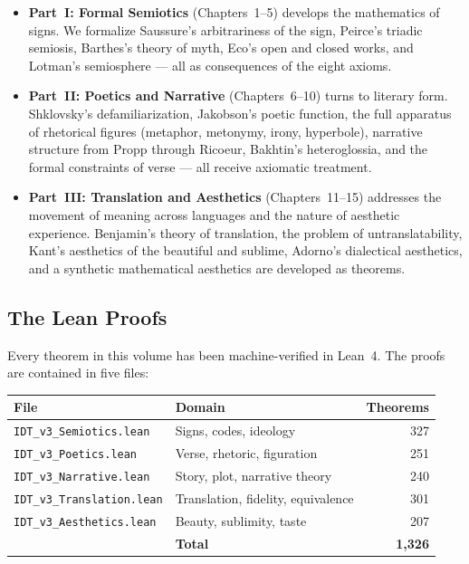 \documentclass[11pt,oneside]{book}
\theoremstyle{plain}
\theoremstyle{definition}
\theoremstyle{remark}
\begin{document}
\begin{itemize}[leftmargin=2em]
\item \textbf{Part~I: Formal Semiotics} (Chapters~1--5) develops the
  mathematics of signs. We formalize Saussure's arbitrariness of the sign,
  Peirce's triadic semiosis, Barthes's theory of myth, Eco's open and closed
  works, and Lotman's semiosphere --- all as consequences of the eight axioms.

\item \textbf{Part~II: Poetics and Narrative} (Chapters~6--10) turns to literary
  form. Shklovsky's defamiliarization, Jakobson's poetic function, the full
  apparatus of rhetorical figures (metaphor, metonymy, irony, hyperbole),
  narrative structure from Propp through Ricoeur, Bakhtin's heteroglossia, and
  the formal constraints of verse --- all receive axiomatic treatment.

\item \textbf{Part~III: Translation and Aesthetics} (Chapters~11--15) addresses
  the movement of meaning across languages and the nature of aesthetic
  experience. Benjamin's theory of translation, the problem of
  untranslatability, Kant's aesthetics of the beautiful and sublime, Adorno's
  dialectical aesthetics, and a synthetic mathematical aesthetics are developed
  as theorems.
\end{itemize}

\subsection*{The Lean Proofs}

Every theorem in this volume has been machine-verified in Lean~4. The proofs are
contained in five files:

\begin{center}
\begin{tabular}{llr}
\textbf{File} & \textbf{Domain} & \textbf{Theorems} \\
\hline
\texttt{IDT\_v3\_Semiotics.lean} & Signs, codes, ideology & 327 \\
\texttt{IDT\_v3\_Poetics.lean} & Verse, rhetoric, figuration & 251 \\
\texttt{IDT\_v3\_Narrative.lean} & Story, plot, narrative theory & 240 \\
\texttt{IDT\_v3\_Translation.lean} & Translation, fidelity, equivalence & 301 \\
\texttt{IDT\_v3\_Aesthetics.lean} & Beauty, sublimity, taste & 207 \\
\hline
& \textbf{Total} & \textbf{1,326}
\end{tabular}
\end{center}
\end{document}
